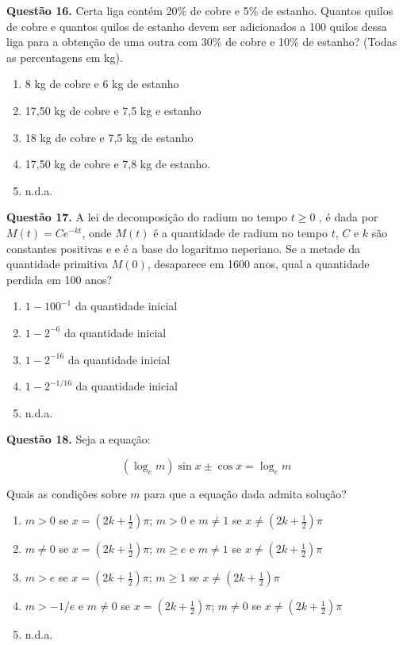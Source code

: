 \documentclass[11pt]{article}
\begin{document}
\textbf{Questão 16.} Certa  liga  contém  20\%  de  cobre  e  5\%  de  estanho.  Quantos  quilos  de  cobre  e  quantos  quilos  de  estanho  devem  ser  adicionados  a  100  quilos  dessa  liga  para  a  obtenção  de  uma  outra  com  30\%  de  cobre  e  10\%  de  estanho? (Todas as percentagens em kg). 

\begin{enumerate}[\bf A (\quad)]
    \item 8 kg de cobre e 6 kg de estanho
    \item 17,50 kg de cobre e 7,5 kg e estanho
    \item 18 kg de cobre e 7,5 kg de estanho
    \item 17,50 kg de cobre e 7,8 kg de estanho.
    \item n.d.a.
\end{enumerate}

\textbf{Questão 17.} A  lei  de  decomposição  do  radium  no  tempo  $t  \geq  0$  ,  é  dada por $M(t)=Ce^{-kt}$, onde $M(t)$ é a quantidade de radium no tempo $t$, $C$ e $k$ são constantes positivas e e é a base do logaritmo neperiano. Se a metade da quantidade primitiva $M(0)$,   desaparece   em   1600   anos,   qual   a   quantidade   perdida em 100 anos?


\begin{enumerate}[\bf A (\quad)]
    \item $1 - 100^{-1}$ da quantidade inicial
    \item $1 - 2^{-6}$ da quantidade inicial
    \item $1 - 2^{-16}$ da quantidade inicial
    \item $1 - 2^{-1/16}$ da quantidade inicial
    \item n.d.a.
\end{enumerate}

\textbf{Questão 18.} Seja a equação: 

$$
(\log_e m)\sin x \pm \cos x = \log_e m
$$

Quais  as  condições  sobre  $m$  para  que  a  equação  dada  admita solução?


\begin{enumerate}[\bf A (\quad)]
    \item $m > 0$ se $x = (2k + \frac{1}{2})\pi$; $m > 0$ e $m \neq 1$ se $x \neq (2k + \frac{1}{2})\pi$
    \item $m \neq 0$ se $x = (2k + \frac{1}{2})\pi$; $m \geq e$ e $m \neq 1$ se $x \neq (2k + \frac{1}{2})\pi$
    \item $m > e$ se $x = (2k + \frac{1}{2})\pi$; $m \geq 1$ se $x \neq (2k + \frac{1}{2})\pi$
    \item $m > -1/e$ e $m \neq 0$ se $x = (2k + \frac{1}{2})\pi$; $m \neq 0$ se $x \neq (2k + \frac{1}{2})\pi$
    \item n.d.a.
\end{enumerate}
\end{document}
